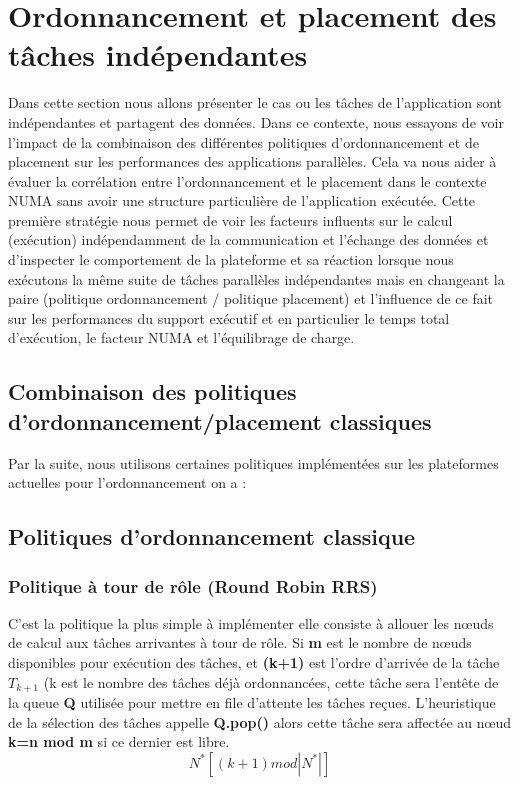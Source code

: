 \section{Ordonnancement et placement des tâches  indépendantes}\label{OPTI}
%
Dans cette section nous allons présenter le cas ou les tâches de l'application sont indépendantes et partagent des données. Dans ce contexte, nous essayons de voir l'impact de la combinaison des différentes politiques d'ordonnancement et de placement sur les performances des applications parallèles. Cela va nous aider à évaluer la  corrélation entre l'ordonnancement et le placement dans le contexte NUMA sans avoir une structure particulière de l'application exécutée. Cette première stratégie nous permet de voir les facteurs influents sur le calcul (exécution) indépendamment de la communication et l'échange des données et d'inspecter le comportement de la plateforme et sa réaction lorsque nous exécutons la même suite de tâches parallèles indépendantes mais en changeant la paire (politique ordonnancement / politique placement) et l'influence de ce fait sur les performances du support exécutif et en particulier le temps total d'exécution, le facteur NUMA et l'équilibrage de charge.
%
\subsection{Combinaison des politiques d'ordonnancement/placement classiques}
Par la suite, nous utilisons certaines politiques implémentées sur les plateformes actuelles pour l'ordonnancement on a :
%
\subsection{Politiques d’ordonnancement classique}
%
\subsubsection{Politique à tour de rôle (Round Robin RRS)} 
%
C'est la politique la plus simple à implémenter elle consiste à allouer les nœuds de calcul aux tâches arrivantes à tour de rôle. Si \textbf{m} est le nombre de nœuds disponibles pour exécution des tâches, et \textbf{(k+1)} est l'ordre d'arrivée de la tâche $T_{k+1}$ (k est le nombre des tâches déjà ordonnancées, cette tâche sera l'entête de la queue \textbf{Q} utilisée pour mettre en file d'attente les tâches reçues. L'heuristique de la sélection des tâches appelle \textbf{Q.pop()} alors cette tâche sera affectée au nœud \textbf{k=n mod m} si ce dernier est libre.
\[
N^*[(k+1) mod |N^*|]
\]
%
